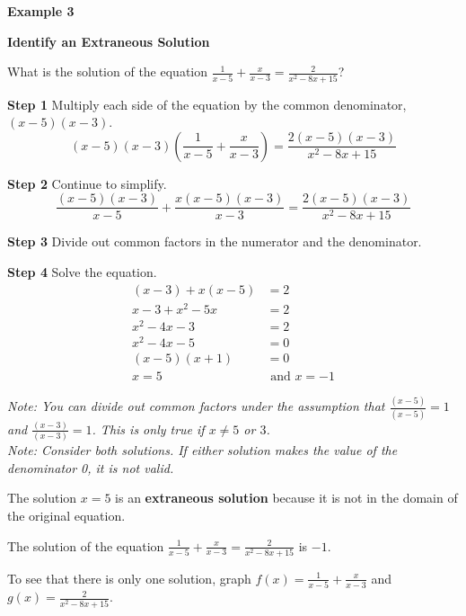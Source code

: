 \documentclass{article}
\newenvironment{example}[1]{\textbf{Example #1}\par}{\vspace{1em}}
\begin{document}
\begin{example}{3}
\textbf{Identify an Extraneous Solution}

What is the solution of the equation $\frac{1}{x-5} + \frac{x}{x-3} = \frac{2}{x^2-8x+15}$?

\textbf{Step 1} Multiply each side of the equation by the common denominator, $(x-5)(x-3)$.
\[
(x-5)(x-3)\left(\frac{1}{x-5} + \frac{x}{x-3}\right) = \frac{2(x-5)(x-3)}{x^2-8x+15}
\]

\textbf{Step 2} Continue to simplify.
\[
\frac{(x-5)(x-3)}{x-5} + \frac{x(x-5)(x-3)}{x-3} = \frac{2(x-5)(x-3)}{x^2-8x+15}
\]

\textbf{Step 3} Divide out common factors in the numerator and the denominator.

\textbf{Step 4} Solve the equation.
\begin{align*}
(x-3) + x(x-5) &= 2 \\
x - 3 + x^2 - 5x &= 2 \\
x^2 - 4x - 3 &= 2 \\
x^2 - 4x - 5 &= 0 \\
(x-5)(x+1) &= 0 \\
x = 5 &\text{ and } x = -1
\end{align*}

\textit{Note: You can divide out common factors under the assumption that $\frac{(x-5)}{(x-5)} = 1$ and $\frac{(x-3)}{(x-3)} = 1$. This is only true if $x \neq 5$ or $3$.} \\
\textit{Note: Consider both solutions. If either solution makes the value of the denominator 0, it is not valid.}

The solution $x = 5$ is an \textbf{extraneous solution} because it is not in the domain of the original equation.

The solution of the equation $\frac{1}{x-5} + \frac{x}{x-3} = \frac{2}{x^2-8x+15}$ is $-1$.

To see that there is only one solution, graph $f(x) = \frac{1}{x-5} + \frac{x}{x-3}$ and $g(x) = \frac{2}{x^2-8x+15}$.

\begin{center}
\end{center}
\end{example}
\end{document}
